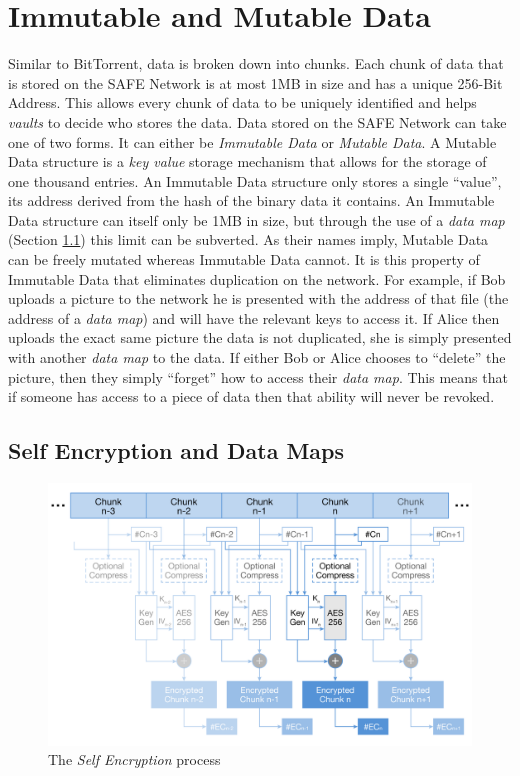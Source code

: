 \section{Immutable and Mutable Data}

Similar to BitTorrent, data is broken down into chunks. Each chunk of data that is stored on the SAFE Network is at most 1MB in size and has a unique 256-Bit Address. This allows every chunk of data to be uniquely identified and helps \textit{vaults} to decide who stores the data. Data stored on the SAFE Network can take one of two forms. It can either be \textit{Immutable Data} or \textit{Mutable Data}. A Mutable Data structure is a \textit{key value} storage mechanism that allows for the storage of one thousand entries. An Immutable Data structure only stores a single ``value'', its address derived from the hash of the binary data it contains. An Immutable Data structure can itself only be 1MB in size, but through the use of a \textit{data map} (Section \ref{subsec:self-encryption-data-map}) this limit can be subverted. As their names imply, Mutable Data can be freely mutated whereas Immutable Data cannot. It is this property of Immutable Data that eliminates duplication on the network. For example, if Bob uploads a picture to the network he is presented with the address of that file (the address of a \textit{data map}) and will have the relevant keys to access it. If Alice then uploads the exact same picture the data is not duplicated, she is simply presented with another \textit{data map} to the data. If either Bob or Alice chooses to ``delete'' the picture, then they simply ``forget'' how to access their \textit{data map}. This means that if someone has access to a piece of data then that ability will never be revoked.

\subsection{Self Encryption and Data Maps}
\label{subsec:self-encryption-data-map}

\begin{figure}[h]
	\begin{center}
		\includegraphics[width=\textwidth]{diagrams/self-encryption}
		\caption{The \textit{Self Encryption} process \protect\footnotemark}
		\label{fig:self-encryption}
	\end{center}
\end{figure}

